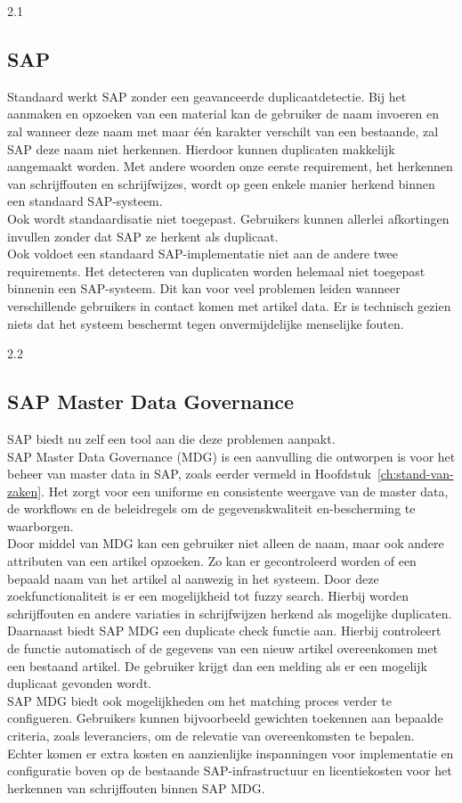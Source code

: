 2.1	\subsection{SAP}
Standaard werkt SAP zonder een geavanceerde duplicaatdetectie. Bij het aanmaken en opzoeken van een material kan de gebruiker de naam invoeren en zal wanneer deze naam met maar één karakter verschilt van een bestaande, zal SAP deze naam niet herkennen. Hierdoor kunnen duplicaten makkelijk aangemaakt worden. Met andere woorden onze eerste requirement, het herkennen van schrijffouten en schrijfwijzes, wordt op geen enkele manier herkend binnen een standaard SAP-systeem.
\\Ook wordt standaardisatie niet toegepast. Gebruikers kunnen allerlei afkortingen invullen zonder dat SAP ze herkent als duplicaat. 
\\Ook voldoet een standaard SAP-implementatie niet aan de andere twee requirements. Het detecteren van duplicaten worden helemaal niet toegepast binnenin een SAP-systeem. Dit kan voor veel problemen leiden wanneer verschillende gebruikers in contact komen met artikel data. Er is technisch gezien niets dat het systeem beschermt tegen onvermijdelijke menselijke fouten.

2.2	\subsection{SAP Master Data Governance}
SAP biedt nu zelf een tool aan die deze problemen aanpakt. 
\\SAP Master Data Governance (MDG) is een aanvulling die ontworpen is voor het beheer van master data in SAP, zoals eerder vermeld in Hoofdstuk~\ref{ch:stand-van-zaken}. Het zorgt voor een uniforme en consistente weergave van de master data, de workflows en de beleidregels om de gegevenskwaliteit en-bescherming te waarborgen. 
\\Door middel van MDG kan een gebruiker niet alleen de naam, maar ook andere attributen van een artikel opzoeken. Zo kan er gecontroleerd worden of een bepaald naam van het artikel al aanwezig in het systeem. Door deze zoekfunctionaliteit is er een mogelijkheid tot fuzzy search. Hierbij worden schrijffouten en andere variaties in schrijfwijzen herkend als mogelijke duplicaten. 
\\Daarnaast biedt SAP MDG een duplicate check functie aan. Hierbij controleert de functie automatisch of de gegevens van een nieuw artikel overeenkomen met een bestaand artikel. De gebruiker krijgt dan een melding als er een mogelijk duplicaat gevonden wordt. 
\\ SAP MDG biedt ook mogelijkheden om het matching proces verder te configueren. Gebruikers kunnen bijvoorbeeld gewichten toekennen aan bepaalde criteria, zoals leveranciers, om de relevatie van overeenkomsten te bepalen.
\\Echter komen er extra kosten en aanzienlijke inspanningen voor implementatie en configuratie boven op de bestaande SAP-infrastructuur en licentiekosten voor het herkennen van schrijffouten binnen SAP MDG.


